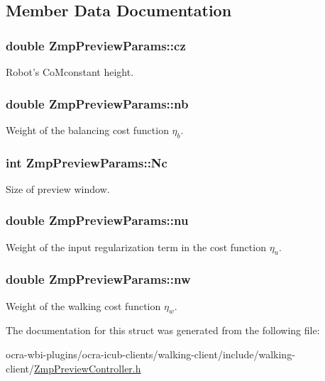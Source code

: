 \subsection{\-Member \-Data \-Documentation}
\hypertarget{structZmpPreviewParams_a4bddbdd99f911c9dddfcb2445da1b7dc}{
\subsubsection[{cz}]{\setlength{\rightskip}{0pt plus 5cm}double {\bf \-Zmp\-Preview\-Params\-::cz}}}\label{structZmpPreviewParams_a4bddbdd99f911c9dddfcb2445da1b7dc}
\-Robot's \-Co\-Mconstant height. \hypertarget{structZmpPreviewParams_abaa39df27b9d8993a940e753b297dcea}{
\subsubsection[{nb}]{\setlength{\rightskip}{0pt plus 5cm}double {\bf \-Zmp\-Preview\-Params\-::nb}}}\label{structZmpPreviewParams_abaa39df27b9d8993a940e753b297dcea}
\-Weight of the balancing cost function $ \eta_b $. \hypertarget{structZmpPreviewParams_adf022d12c133e9a17a41c1a9864fdef0}{
\subsubsection[{\-Nc}]{\setlength{\rightskip}{0pt plus 5cm}int {\bf \-Zmp\-Preview\-Params\-::\-Nc}}}\label{structZmpPreviewParams_adf022d12c133e9a17a41c1a9864fdef0}
\-Size of preview window. \hypertarget{structZmpPreviewParams_a3be5d92df5593e2a7c5694beaf912dac}{
\subsubsection[{nu}]{\setlength{\rightskip}{0pt plus 5cm}double {\bf \-Zmp\-Preview\-Params\-::nu}}}\label{structZmpPreviewParams_a3be5d92df5593e2a7c5694beaf912dac}
\-Weight of the input regularization term in the cost function $\eta_u$. \hypertarget{structZmpPreviewParams_ae09ca5b74feda7b0af99c07cd7a36c64}{
\subsubsection[{nw}]{\setlength{\rightskip}{0pt plus 5cm}double {\bf \-Zmp\-Preview\-Params\-::nw}}}\label{structZmpPreviewParams_ae09ca5b74feda7b0af99c07cd7a36c64}
\-Weight of the walking cost function $ \eta_w $. 

\-The documentation for this struct was generated from the following file\-:\begin{DoxyCompactItemize}
\item 
ocra-\/wbi-\/plugins/ocra-\/icub-\/clients/walking-\/client/include/walking-\/client/\hyperlink{ZmpPreviewController_8h}{\-Zmp\-Preview\-Controller.\-h}\end{DoxyCompactItemize}

